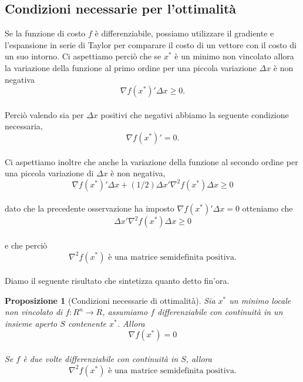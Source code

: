\documentclass[a4paper, 12pt]{article}
\newtheorem{prop}{Proposizione}
\begin{document}
\subsection{Condizioni necessarie per l'ottimalità}
Se la funzione di costo $f$ è differenziabile, possiamo utilizzare il gradiente e l'espansione in serie di Taylor per comparare il costo di un vettore con il costo di un suo intorno.
Ci aspettiamo perciò che se $x^\ast$ è un minimo non vincolato allora la variazione della funzione al primo ordine per una piccola variazione $\Delta x$ è non negativa\\
\[\nabla f ( x^\ast )' \Delta x \geq 0.\]\\
Perciò valendo sia per $\Delta x$ positivi che negativi abbiamo la seguente condizione necessaria,\\
\[\nabla f ( x^\ast )' = 0. \]\\
Ci aspettiamo inoltre che anche la variazione della funzione al secondo ordine per una piccola variazione di $\Delta x$ è non negativa,\\
\[\nabla f ( x^\ast )' \Delta x + (1/2) \Delta x' \nabla ^2 f (x^\ast) \Delta x\geq 0\]\\
dato che la precedente osservazione ha imposto $\nabla f (x^\ast)' \Delta x = 0$ otteniamo che\\
\[\Delta x' \nabla ^2 f (x^\ast) \Delta x\geq 0\]\\
e che perciò\\
\[\nabla ^2 f (x^\ast) \mbox{ è una matrice semidefinita positiva.}\]\\
Diamo il seguente risultato che sintetizza quanto detto fin'ora.
\begin{prop}[Condizioni necessarie di ottimalità]
Sia $x^\ast$ un minimo locale non vincolato di $f:R^n \to R$, assumiamo $f$ differenziabile con continuità in un insieme aperto $S$ contenente $x^\ast$. Allora\\
\[\nabla f(x^\ast) = 0\]\\
Se $f$ è due volte differenziabile con continuità in $S$, allora\\
\[\nabla^2 f(x^\ast) \mbox{ è una matrice semidefinita positiva.}\]
\end{prop}
\end{document}
